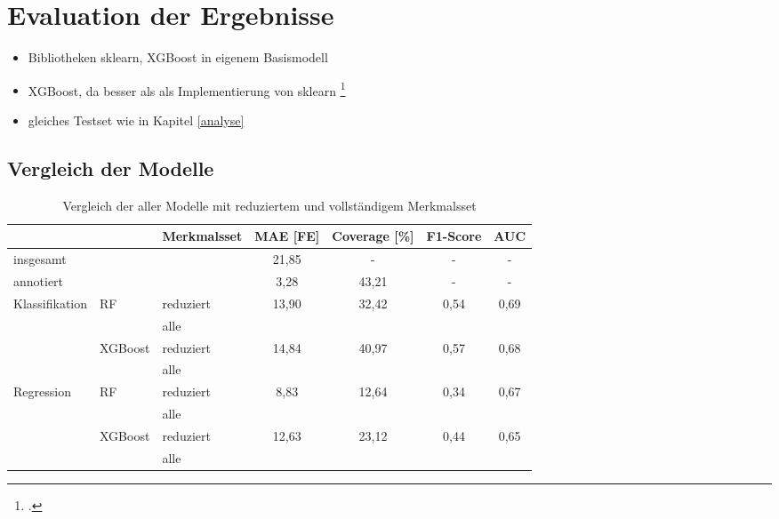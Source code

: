 \chapter{Evaluation der Ergebnisse}

\begin{itemize}
	\item Bibliotheken sklearn, XGBoost in eigenem Basismodell
	\item \ac{XGBoost}, da besser als als Implementierung von sklearn \footcite[Kapitel 10]{Harrison2019}
	\item gleiches Testset wie in Kapitel \ref{analyse}
\end{itemize}

\section{Vergleich der Modelle}
	
	\begin{table}[H]
		\begin{tabular}{l l | l|| c | c | c | c }
 						&				& Merkmalsset	& \ac{MAE} [FE]	& Coverage [\%]	& F1-Score	& AUC	\\ \hline
 		insgesamt		&	 			&				& 21{,}85		& -				& - 		& -		\\
 		annotiert		&				&				& 3{,}28			& 43{,}21		& - 		& -		\\ \hline
 		\multirow{4}{*}{Klassifikation}
 						& \multirow{2}{*}{\acs{RF}}		
 										& reduziert 		& 13{,}90		& 32{,}42		& 0{,}54	& 0,69	\\
 						&				& alle			&\\\cline{2-7}
 						& \multirow{2}{*}{\acs{XGBoost}}
 									 	& reduziert		& 14{,}84		& 40{,}97		& 0{,}57	& 0,68	\\ 
 						&				& alle 			&\\\hline
 		\multirow{4}{*}{Regression}				
 					 	& \multirow{2}{*}{\acs{RF}}		
 					 					& reduziert		& 8{,}83			& 12{,}64		& 0{,}34	& 0,67	\\
 					 	&				& alle			&\\\cline{2-7}
 						& \multirow{2}{*}{\acs{XGBoost}}
 										& reduziert		& 12{,}63		& 23{,}12		& 0{,}44	& 0,65	\\
 						&				& alle			&\\
		\end{tabular}
		\caption{Vergleich der aller Modelle mit reduziertem und vollständigem Merkmalsset}
	\end{table}
	
